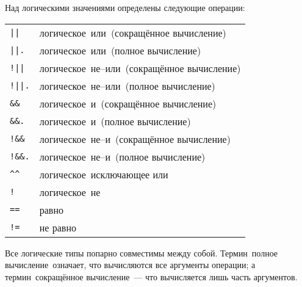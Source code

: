 \documentclass[10pt]{report}
\begin{document}
Над логическими значениями определены следующие операции:
\begin{longtable}{ll}
	\texttt{||}             & логическое\ \glqq или\grqq\ (сокращённое вычисление)      \\
	\texttt{||.}            & логическое\ \glqq или\grqq\ (полное вычисление)           \\
	\texttt{!||}            & логическое\ \glqq не--или\grqq\ (сокращённое вычисление)  \\
	\texttt{!||.}           & логическое\ \glqq не--или\grqq\ (полное вычисление)       \\
	\texttt{\&\&}           & логическое\ \glqq и\grqq\ (сокращённое вычисление)        \\
	\texttt{\&\&.}          & логическое\ \glqq и\grqq\ (полное вычисление)             \\
	\texttt{!\&\&}          & логическое\ \glqq не--и\grqq\ (сокращённое вычисление)    \\
	\texttt{!\&\&.}         & логическое\ \glqq не--и\grqq\ (полное вычисление)         \\
	\texttt{\^{ }\^{ }}     & логическое\ \glqq исключающее или\grqq\                   \\
	\texttt{!}              & логическое\ \glqq не\grqq\                                \\
	\texttt{==}             & равно                                                     \\
	\texttt{!=}             & не равно                                                  \\
\end{longtable}


Все логические типы попарно совместимы между собой. Термин\ \glqq полное вычисление\grqq\ означает, что вычисляются все аргументы операции; а термин\ \glqq сокращённое
вычисление\grqq\ --- что вычисляется лишь часть аргументов.
\end{document}
